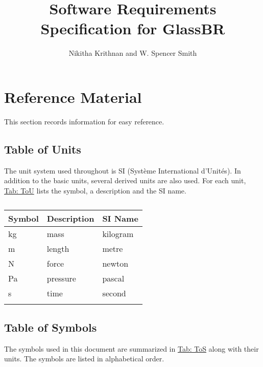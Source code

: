 \documentclass[12pt]{article}
\title{Software Requirements Specification for GlassBR}
\author{Nikitha Krithnan and W. Spencer Smith}
\begin{document}
\maketitle
\tableofcontents
\newpage
\section{Reference Material}
\label{Sec:RefMat}
This section records information for easy reference.

\subsection{Table of Units}
\label{Sec:ToU}
The unit system used throughout is SI (Système International d'Unités). In addition to the basic units, several derived units are also used. For each unit, \hyperref[Table:ToU]{Tab: ToU} lists the symbol, a description and the SI name.

\begin{longtable}{l l l}
\toprule
\textbf{Symbol} & \textbf{Description} & \textbf{SI Name}
\\
\midrule
\endhead
kg & mass & kilogram
\\
m & length & metre
\\
N & force & newton
\\
Pa & pressure & pascal
\\
s & time & second
\\
\bottomrule
\caption{}
\label{Table:ToU}
\end{longtable}
\subsection{Table of Symbols}
\label{Sec:ToS}
The symbols used in this document are summarized in \hyperref[Table:ToS]{Tab: ToS} along with their units. The symbols are listed in alphabetical order.
\end{document}
